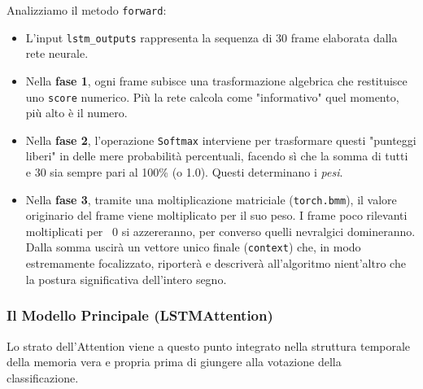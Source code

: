 Analizziamo il metodo \texttt{forward}:
\begin{itemize}
    \item L'input \texttt{lstm\_outputs} rappresenta la sequenza di 30 frame elaborata dalla rete neurale.
    \item Nella \textbf{fase 1}, ogni frame subisce una trasformazione algebrica che restituisce uno \texttt{score} numerico. Più la rete calcola come "informativo" quel momento, più alto è il numero.
    \item Nella \textbf{fase 2}, l'operazione \texttt{Softmax} interviene per trasformare questi "punteggi liberi" in delle mere probabilità percentuali, facendo sì che la somma di tutti e 30 sia sempre pari al 100\% (o 1.0). Questi determinano i \textit{pesi}.
    \item Nella \textbf{fase 3}, tramite una moltiplicazione matriciale (\texttt{torch.bmm}), il valore originario del frame viene moltiplicato per il suo peso. I frame poco rilevanti moltiplicati per ~0 si azzereranno, per converso quelli nevralgici domineranno. Dalla somma uscirà un vettore unico finale (\texttt{context}) che, in modo estremamente focalizzato, riporterà e descriverà all'algoritmo nient'altro che la postura significativa dell'intero segno.
\end{itemize}

\subsubsection{Il Modello Principale (LSTMAttention)}
Lo strato dell'Attention viene a questo punto integrato nella struttura temporale della memoria vera e propria prima di giungere alla votazione della classificazione.

